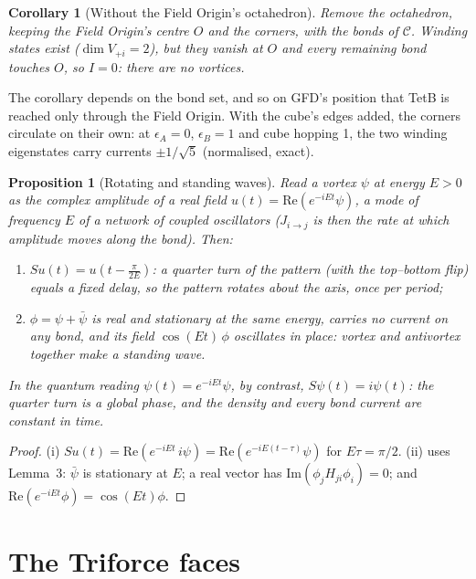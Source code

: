 \documentclass[twocolumn]{iopjournal}
\newtheorem{proposition}{Proposition}
\newtheorem{corollary}{Corollary}
\theoremstyle{definition}
\theoremstyle{remark}
\begin{document}
\begin{corollary}[Without the Field Origin's octahedron]
Remove the octahedron, keeping the Field Origin's centre $O$ and the
corners, with the bonds of $\mathcal C$. Winding states exist ($\dim V_{+i} = 2$), but they
vanish at $O$ and every remaining bond touches $O$, so $I = 0$: there
are no vortices.
\end{corollary}

The corollary depends on the bond set, and so on GFD's position that
TetB is reached only through the Field Origin. With the cube's edges
added, the corners circulate on their own: at $\epsilon_A = 0$,
$\epsilon_B = 1$ and cube hopping 1, the two winding eigenstates carry
currents $\pm1/\sqrt5$ (normalised, exact).

\begin{proposition}[Rotating and standing waves]
\label{prop:standing}
Read a vortex $\psi$ at energy $E > 0$ as the complex amplitude of a
real field $u(t) = \mathrm{Re}(e^{-iEt}\psi)$, a mode of frequency $E$
of a network of coupled oscillators ($J_{i\to j}$ is then the rate at
which amplitude moves along the bond). Then:
\begin{enumerate}
\item[(i)] $Su(t) = u(t - \tfrac{\pi}{2E})$: a quarter turn of the
  pattern (with the top--bottom flip) equals a fixed delay, so the
  pattern rotates about the axis, once per period;
\item[(ii)] $\phi = \psi + \bar\psi$ is real and stationary at the same
  energy, carries no current on any bond, and its field
  $\cos(Et)\,\phi$ oscillates in place: vortex and antivortex together
  make a standing wave.
\end{enumerate}
In the quantum reading $\psi(t) = e^{-iEt}\psi$, by contrast,
$S\psi(t) = i\psi(t)$: the quarter turn is a global phase, and the
density and every bond current are constant in time.
\end{proposition}

\begin{proof}
(i) $Su(t) = \mathrm{Re}(e^{-iEt}\,i\psi) = \mathrm{Re}(e^{-iE(t-\tau)}
\psi)$ for $E\tau = \pi/2$. (ii) uses Lemma~3: $\bar\psi$ is
stationary at $E$; a real vector has
$\mathrm{Im}(\phi_jH_{ji}\phi_i) = 0$; and
$\mathrm{Re}(e^{-iEt}\phi) = \cos(Et)\phi$.
\end{proof}


\section{The Triforce faces}
\end{document}
